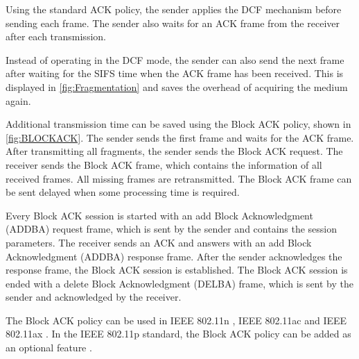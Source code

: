 Using the standard \ac{ACK} policy, the sender applies the \ac{DCF} mechanism before sending each frame.
The sender also waits
for an \ac{ACK} frame from the receiver after each transmission.

Instead of operating in the \ac{DCF} mode, the sender
can also send the next frame after waiting for the \ac{SIFS} time when the \ac{ACK} frame has been received.
This is displayed in \autoref{fig:Fragmentation} and saves the overhead of acquiring the medium again.

Additional transmission time can be saved using the Block \ac{ACK} policy, shown in \autoref{fig:BLOCKACK}.
The sender sends the first frame and waits for the \ac{ACK} frame.
After transmitting all fragments, the sender sends the Block \ac{ACK} request.
The receiver sends the Block \ac{ACK} frame, which contains the information of all received frames.
All missing frames are retransmitted.
The Block \ac{ACK} frame can be sent delayed when some processing time is required.

Every Block \ac{ACK} session is started with an add Block Acknowledgment (ADDBA) request frame, which is sent by the sender and
contains the session parameters.
The receiver sends an \ac{ACK} and answers with an add Block Acknowledgment (ADDBA) response frame.
After the sender acknowledges the response frame, the Block \ac{ACK} session is established.
The Block \ac{ACK} session is ended with a delete Block Acknowledgment (DELBA) frame, which is sent by the sender and acknowledged by the receiver.

The Block \ac{ACK} policy can be used in IEEE 802.11n \cite{noauthor_ieee_2021-1}, IEEE 802.11ac \cite{noauthor_ieee_2021-1} and IEEE 802.11ax \cite{noauthor_ieee_2021}.
In the IEEE 802.11p standard, the Block \ac{ACK} policy can be added as an optional feature \cite{noauthor_ieee_2021-1}.

